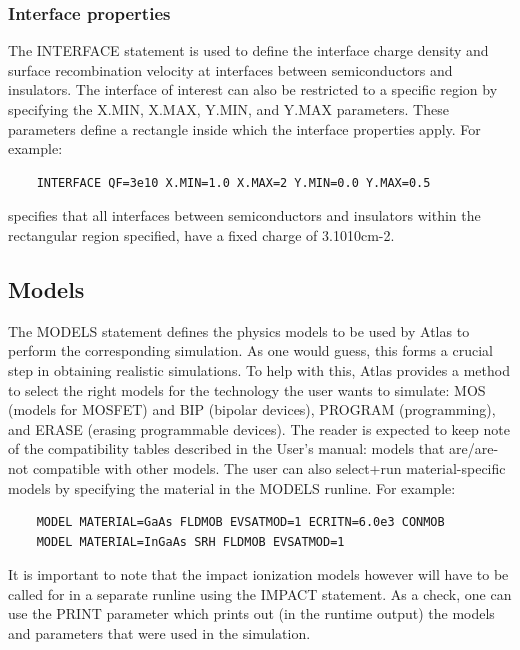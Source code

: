 \documentclass[11pt]{article}
\begin{document}
\subsubsection{Interface properties}
The INTERFACE statement is used to define the interface charge density and surface recombination velocity at interfaces between semiconductors and insulators. The interface of interest can also be restricted to a specific region by specifying the X.MIN, X.MAX, Y.MIN, and Y.MAX parameters. These parameters define a rectangle inside which the interface properties apply. For example:
\begin{verbatim}
    INTERFACE QF=3e10 X.MIN=1.0 X.MAX=2 Y.MIN=0.0 Y.MAX=0.5
\end{verbatim}
specifies that all interfaces between semiconductors and insulators within the rectangular region specified, have a fixed charge of 3.1010cm-2.

\subsection{Models}
The MODELS statement defines the physics models to be used by Atlas to perform the corresponding simulation. As one would guess, this forms a crucial step in obtaining realistic simulations. To help with this, Atlas provides a method to select the right models for the technology the user wants to simulate: MOS (models for MOSFET) and BIP (bipolar devices), PROGRAM (programming), and ERASE (erasing programmable devices). The reader is expected to keep note of the compatibility tables described in the User's manual: models that are/are-not compatible with other models.
\newline The user can also select+run material-specific models by specifying the material in the MODELS runline. For example:
\begin{verbatim}
    MODEL MATERIAL=GaAs FLDMOB EVSATMOD=1 ECRITN=6.0e3 CONMOB
    MODEL MATERIAL=InGaAs SRH FLDMOB EVSATMOD=1
\end{verbatim}
It is important to note that the impact ionization models however will have to be called for in a separate runline using the IMPACT statement. 
\newline As a check, one can use the PRINT parameter which prints out (in the runtime output) the models and parameters that were used in the simulation.


\end{document}
